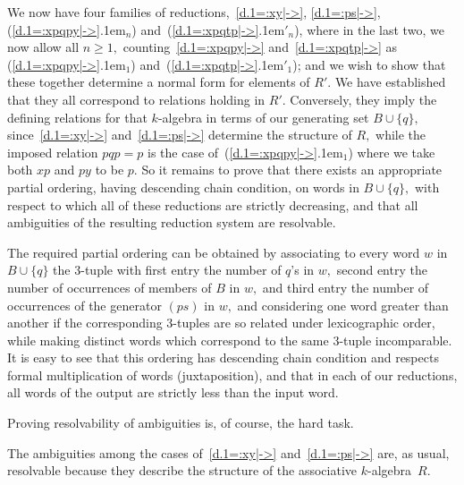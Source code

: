 \documentclass{amsart}
\begin{document}
We now have four families of reductions,~\eqref{d.1=:xy|->},
\eqref{d.1=:ps|->}, ({{\setlength{\mathsurround}{0em}\ref{d.1=:xpqpy|->}\kern.1em$_{{n}}$}}) and~({{\setlength{\mathsurround}{0em}\ref{d.1=:xpqtp|->}\kern.1em$'_{{n}}$}}),
where in the last two, we now allow all $n\geq 1,$
counting~\eqref{d.1=:xpqpy|->} and~\eqref{d.1=:xpqtp|->} as
({{\setlength{\mathsurround}{0em}\ref{d.1=:xpqpy|->}\kern.1em$_{{1}}$}}) and~({{\setlength{\mathsurround}{0em}\ref{d.1=:xpqtp|->}\kern.1em$'_{{1}}$}});
and we wish to show that these together
determine a normal form for elements of $R'.$
We have established that they all correspond to relations
holding in $R'.$
Conversely, they imply the defining relations for that
$\!k\!$-algebra in terms of our generating set $B\cup\{q\},$
since~\eqref{d.1=:xy|->} and~\eqref{d.1=:ps|->} determine
the structure of $R,$ while the imposed relation $pqp=p$
is the case of~({{\setlength{\mathsurround}{0em}\ref{d.1=:xpqpy|->}\kern.1em$_{{1}}$}}) where
we take both $xp$ and $py$ to be $p.$
So it remains to prove that there exists an appropriate partial
ordering, having descending chain condition, on words in $B\cup\{q\},$
with respect to which all of these reductions are strictly decreasing,
and that all ambiguities of the resulting reduction system
are resolvable.

The required partial ordering can be obtained by associating
to every word $w$ in $B\cup\{q\}$ the $\!3\!$-tuple with
first entry the number of $\!q\!$'s in $w,$
second entry the number of occurrences of members of $B$ in $w,$
and third entry the number of occurrences
of the generator $(ps)$ in $w,$ and considering one word
greater than another if the corresponding $\!3\!$-tuples
are so related under lexicographic order, while making
distinct words which correspond to the same $\!3\!$-tuple incomparable.
It is easy to see that this ordering has descending chain
condition and respects formal
multiplication of words (juxtaposition), and that in
each of our reductions, all words of the output are strictly less
than the input word.

Proving resolvability of ambiguities is, of course, the hard task.

The ambiguities among
the cases of~\eqref{d.1=:xy|->} and~\eqref{d.1=:ps|->}
are, as usual, resolvable because they describe the
structure of the associative $\!k\!$-algebra~$R.$
\end{document}

